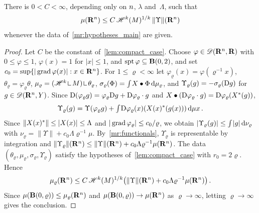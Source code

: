 \documentclass[a4paper,twoside,leqno]{article}
\begin{document}
\begin{theorem}
    \label{thm:main}
    There is $0 < C < \infty$, depending only on $n$, $\lambda$ and~$\Lambda$, such that
    \begin{displaymath}
        \mu(\mathbf{R}^{n}) \le C \, \mathscr{H}^{k}(M)^{1/k} \, \|\Upsilon\|(\mathbf{R}^{n})
    \end{displaymath}
    whenever the data of~\ref{mr:hypotheses_main} are given.
\end{theorem}

\begin{proof}
    Let $C$ be the constant of~\ref{lem:compact_case}. Choose $\varphi \in \mathscr{D}(\mathbf{R}^{n},\mathbf{R})$
    with $0 \le \varphi \le 1$, $\varphi(x) = 1$ for $|x| \le 1$, and $\operatorname{spt} \varphi \subseteq
    \mathbf{B}(0,2)$, and set $c_0 = \sup \{ |\operatorname{grad} \varphi(x)| : x \in \mathbf{R}^{n} \}$. For $1 \le
    \varrho < \infty$ let $\varphi_\varrho(x) = \varphi(\varrho^{-1} x)$, $\theta_\varrho =
    \varphi_\varrho \theta$, $\mu_\varrho = (\HM^{\vdim} \restrict M) \restrict \theta_\varrho$,
    $\sigma_\varrho(\Phi) = {\textstyle\int_{}^{}} X \bullet \Phi \,\mathrm{d} \mu_\varrho$, and $\Upsilon_\varrho(g)
    = - \sigma_\varrho(\mathrm{D} g)$ for $g \in \mathscr{D}(\mathbf{R}^{n},Y)$. Since $\mathrm{D}(\varphi_\varrho g) =
    \varphi_\varrho \mathrm{D} g + \mathrm{D} \varphi_\varrho \cdot g$ and $X \bullet (\mathrm{D} \varphi_\varrho \cdot
    g) = \mathrm{D} \varphi_\varrho(X^{*}(g))$,
    \begin{displaymath}
        \Upsilon_\varrho(g) = \Upsilon(\varphi_\varrho g) + {\textstyle\int_{}^{}} \mathrm{D}
        \varphi_\varrho(x)(X(x)^{*}(g(x))) \,\mathrm{d} \mu x \,.
    \end{displaymath}
    Since $\|X(x)^{*}\| \le |X(x)| \le \Lambda$ and $|\operatorname{grad} \varphi_\varrho| \le c_0 /
    \varrho$, we obtain $|\Upsilon_\varrho(g)| \le {\textstyle\int_{}^{}} |g| \,\mathrm{d} \nu_\varrho$ with
    $\nu_\varrho = \|\Upsilon\| + c_0 \Lambda \varrho^{-1} \mu$. By~\ref{mr:functionals},
    $\Upsilon_\varrho$ is representable by integration and $\|\Upsilon_\varrho\|(\mathbf{R}^{n}) \le
    \|\Upsilon\|(\mathbf{R}^{n}) + c_0 \Lambda \varrho^{-1} \mu(\mathbf{R}^{n})$. The data
    $(\theta_\varrho, \mu_\varrho, \sigma_\varrho, \Upsilon_\varrho)$ satisfy the hypotheses
    of~\ref{lem:compact_case} with $r_0 = 2 \varrho$. Hence
    \begin{displaymath}
        \mu_\varrho(\mathbf{R}^{n}) \le C \, \mathscr{H}^{k}(M)^{1/k} \bigl( \|\Upsilon\|(\mathbf{R}^{n}) +
        c_0 \Lambda \varrho^{-1} \mu(\mathbf{R}^{n}) \bigr) \,.
    \end{displaymath}
    Since $\mu(\mathbf{B}(0,\varrho)) \le \mu_\varrho(\mathbf{R}^{n})$ and $\mu(\mathbf{B}(0,\varrho)) \to
    \mu(\mathbf{R}^{n})$ as $\varrho \to \infty$, letting $\varrho \to \infty$ gives the
    conclusion.
\end{proof}
\end{document}
